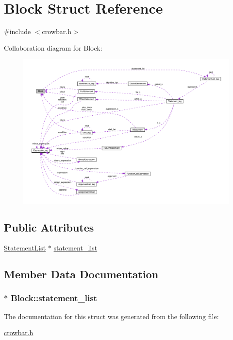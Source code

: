 \hypertarget{struct_block}{}\section{Block Struct Reference}
\label{struct_block}


{\ttfamily \#include $<$crowbar.\+h$>$}



Collaboration diagram for Block\+:\nopagebreak
\begin{figure}[H]
\begin{center}
\leavevmode
\includegraphics[width=350pt]{struct_block__coll__graph}
\end{center}
\end{figure}
\subsection*{Public Attributes}
\begin{DoxyCompactItemize}
\item 
\hyperlink{crowbar_8h_a8bffae51ec8146f480c3c14c61b4ff93}{Statement\+List} $\ast$ \hyperlink{struct_block_a1f7e56d13e2d1c72dce500d10253bc25}{statement\+\_\+list}
\end{DoxyCompactItemize}


\subsection{Member Data Documentation}
\hypertarget{struct_block_a1f7e56d13e2d1c72dce500d10253bc25}{}
\subsubsection[{statement\+\_\+list}]{$\ast$ Block\+::statement\+\_\+list}\label{struct_block_a1f7e56d13e2d1c72dce500d10253bc25}


The documentation for this struct was generated from the following file\+:\begin{DoxyCompactItemize}
\item 
\hyperlink{crowbar_8h}{crowbar.\+h}\end{DoxyCompactItemize}
